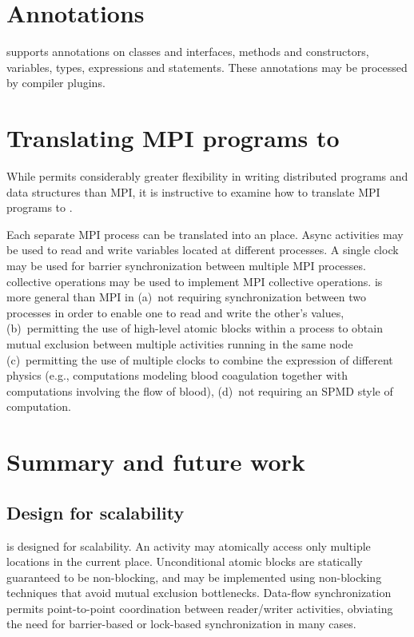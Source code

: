 \section{Annotations}

\Xten{} supports annotations on classes and interfaces, methods
and constructors,
variables, types, expressions and statements.
These annotations may be processed by compiler plugins.

\section{Translating MPI programs to \Xten{}}

While \Xten{} permits considerably greater flexibility in writing
distributed programs and data structures than MPI, it is instructive
to examine how to translate MPI programs to \Xten.

Each separate MPI process can be translated into an \Xten{}
place. Async activities may be used to read and write variables
located at different processes. A single clock may be used for barrier
synchronization between multiple MPI processes. \Xten{} collective
operations may be used to implement MPI collective operations.
\Xten{} is more general than MPI in (a)~not requiring synchronization
between two processes in order to enable one to read and write the
other's values, (b)~permitting the use of high-level atomic blocks
within a process to obtain mutual exclusion between multiple
activities running in the same node (c)~permitting the use of multiple
clocks to combine the expression of different physics (e.g.,
computations modeling blood coagulation together with computations
involving the flow of blood), (d)~not requiring an SPMD style of
computation.


\section{Summary and future work}
\subsection{Design for scalability}
\Xten{} is designed for scalability. An activity may atomically
access only multiple locations in the current place. Unconditional
atomic blocks are statically guaranteed to be non-blocking, and may
be implemented using non-blocking techniques that avoid mutual
exclusion bottlenecks. Data-flow synchronization permits point-to-point
coordination between reader/writer activities, obviating the need for
barrier-based or lock-based synchronization in many cases.

